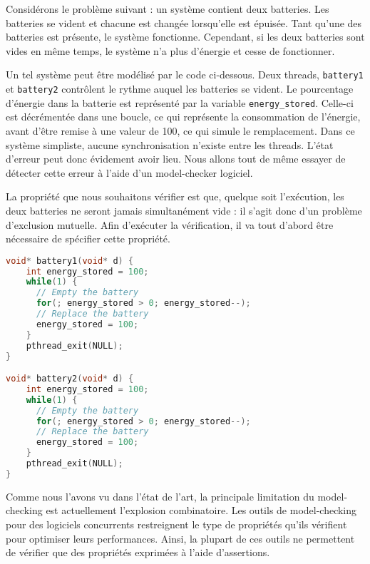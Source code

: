 \label{sec:Theme1}

Considérons le problème suivant : un système contient deux batteries. Les
batteries se vident et chacune est changée lorsqu'elle est épuisée. Tant qu'une
des batteries est présente, le système fonctionne. Cependant, si les deux
batteries sont vides en même temps, le système n'a plus d'énergie et cesse de
fonctionner.

Un tel système peut être modélisé par le code ci-dessous. Deux threads,
\lstinline!battery1! et \lstinline!battery2! contrôlent le rythme auquel les
batteries se vident. Le pourcentage d'énergie dans la batterie est représenté
par la variable \lstinline!energy_stored!. Celle-ci est décrémentée dans une
boucle, ce qui représente la consommation de l'énergie, avant d'être remise à
une valeur de 100, ce qui simule le remplacement. Dans ce système simpliste,
aucune synchronisation n'existe entre les threads. L'état d'erreur peut donc
évidement avoir lieu. Nous allons tout de même essayer de détecter cette erreur
à l'aide d'un model-checker logiciel.

La propriété que nous souhaitons vérifier est que, quelque soit
l'exécution, les deux batteries ne seront jamais simultanément vide : il
s'agit donc d'un problème d'exclusion mutuelle. Afin d'exécuter la
vérification, il va tout d'abord être nécessaire de spécifier cette
propriété.

\begin{lstlisting}[language=C]
void* battery1(void* d) {
    int energy_stored = 100;
    while(1) {
      // Empty the battery
      for(; energy_stored > 0; energy_stored--);
      // Replace the battery
      energy_stored = 100;
    }
    pthread_exit(NULL);
}

void* battery2(void* d) {
    int energy_stored = 100;
    while(1) {
      // Empty the battery
      for(; energy_stored > 0; energy_stored--);
      // Replace the battery
      energy_stored = 100;
    }
    pthread_exit(NULL);
}
\end{lstlisting}

Comme nous l'avons vu dans l'état de l'art, la principale limitation du
model-checking est actuellement l'explosion combinatoire. Les outils de
model-checking pour des logiciels concurrents restreignent le type de
propriétés qu'ils vérifient pour optimiser leurs performances. Ainsi, la
plupart de ces outils ne permettent de vérifier que des propriétés
exprimées à l'aide d'assertions.

